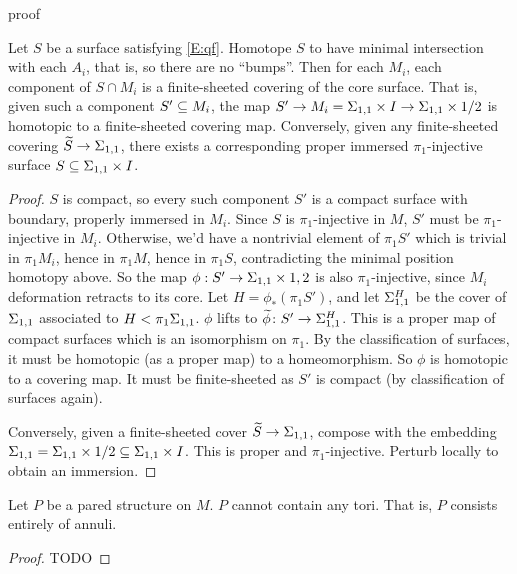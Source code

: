 proof


\begin{lemma}\label{L:sc}

Let $S$ be a surface satisfying \eqref{E:qf}. Homotope $S$ to have minimal
intersection with each $A_i$, that is, so there are no ``bumps''.  Then for
each $M_i$, each component of $S \cap M_i$ is a finite-sheeted covering of the
core surface.  That is, given such a component $S' \subseteq M_i$, the map $S' \to
M_i = \Sigma_{1,1}\times I \to \Sigma_{1,1}\times{1/2}$ is homotopic to a finite-sheeted
covering map. Conversely, given any finite-sheeted covering $\widetilde{S} \to
\Sigma_{1,1}$, there exists a corresponding proper immersed $\pi_1$-injective
surface $S \subseteq \Sigma_{1,1}\times I$.

\end{lemma}
\begin{proof}

$S$ is compact, so every such component $S'$ is a compact surface with
boundary, properly immersed in $M_i$. Since $S$ is $\pi_1$-injective in $M$,
$S'$ must be $\pi_1$-injective in $M_i$. Otherwise, we'd have a nontrivial
element of $\pi_1S'$ which is trivial in $\pi_1M_i$, hence in $\pi_1M$, hence
in $\pi_1S$, contradicting the minimal position homotopy above. So the map
$\phi : S'\to\Sigma_{1,1}\times{1,2}$ is also $\pi_1$-injective, since $M_i$
deformation retracts to its core. Let $H = \phi_*(\pi_1S')$, and let
$\Sigma_{1,1}^H$ be the cover of $\Sigma_{1,1}$ associated to $H<\pi_1\Sigma_{1,1}$.
$\phi$ lifts to $\widetilde{\phi}\colon S'\to \Sigma_{1,1}^H$. This is a proper
map of compact surfaces which is an isomorphism on $\pi_1$.  By the
classification of surfaces, it must be homotopic (as a proper map) to
a homeomorphism. So $\phi$ is homotopic to a covering map. It must be
finite-sheeted as $S'$ is compact (by classification of surfaces again).

Conversely, given a finite-sheeted cover $\widetilde{S}\to \Sigma_{1,1}$, compose
with the embedding $\Sigma_{1,1} = \Sigma_{1,1}\times{1/2} \subseteq \Sigma_{1,1}\times I$. This is
proper and $\pi_1$-injective.  Perturb locally to obtain an immersion.

\end{proof}

\begin{lemma}

Let $P$ be a pared structure on $M$. $P$ cannot contain any tori. That is,
$P$ consists entirely of annuli.

\end{lemma}
\begin{proof}

TODO

\end{proof}

